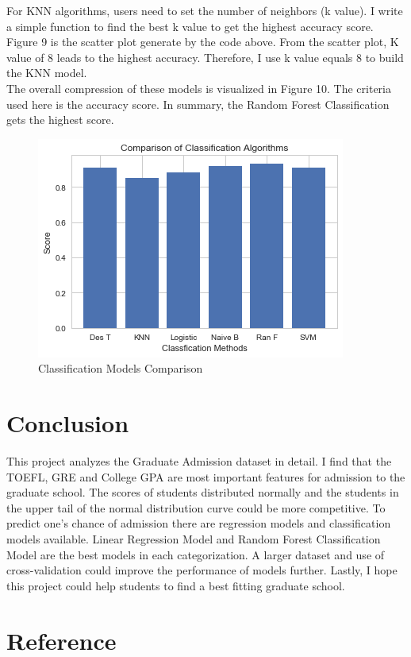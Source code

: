 \documentclass[12pt]{article}
\begin{document}
\begin{sloppypar}
For KNN algorithms, users need to set the number of neighbors (k value). I write a simple function to find the best k value to get the highest accuracy score. Figure 9 is the scatter plot generate by the code above. From the scatter plot, K value of 8 leads to the highest accuracy. Therefore, I use k value equals 8 to build the KNN model. \\
The overall compression of these models is visualized in Figure 10. The  criteria used here is the accuracy score. In summary, the Random Forest Classification gets the highest score.
\begin{figure}[H]
    \centering
    \includegraphics[scale = 1]{classficaiton_comparision.png}
    \caption{Classification Models Comparison}
\end{figure}

\section{Conclusion}

This project analyzes the Graduate Admission dataset in detail. I find that the TOEFL, GRE and College GPA are most important features for admission to the graduate school. The scores of students distributed normally and the students in the upper tail of the normal distribution curve could be more competitive. To predict one's chance of admission there are regression models and classification models available. Linear Regression Model and Random Forest Classification Model are the best models in each categorization. A larger dataset and use of cross-validation could improve the performance of models further. Lastly, I hope this project could help students to find a best fitting graduate school.

\newpage

\section{Reference}


\end{sloppypar}
\end{document}
